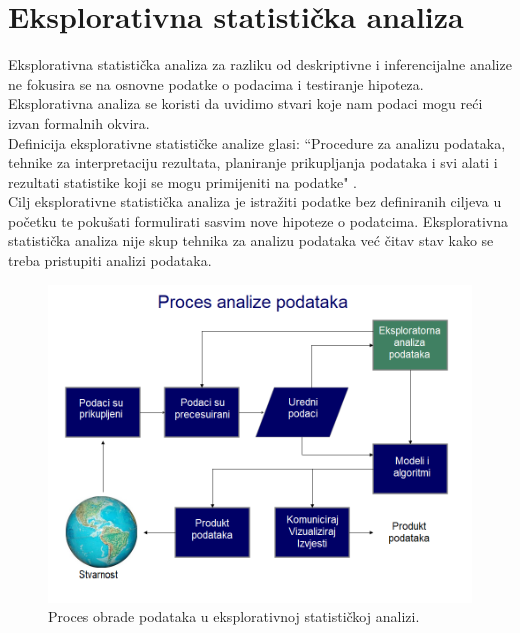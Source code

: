\documentclass[times,utf8,zavrsni]{fer}
\begin{document}



\newpage
\section{Eksplorativna statistička analiza}
Eksplorativna statistička analiza za razliku od deskriptivne i inferencijalne analize ne fokusira se na osnovne podatke o podacima i testiranje hipoteza. Eksplorativna analiza se koristi da uvidimo stvari koje nam podaci mogu reći izvan formalnih okvira. \\

Definicija eksplorativne statističke analize glasi: ``Procedure za analizu podataka, tehnike za interpretaciju rezultata, planiranje prikupljanja podataka i svi alati i rezultati statistike koji se mogu primijeniti na podatke" \citep{tukey}. \\

Cilj eksplorativne statistička analiza je istražiti podatke bez definiranih ciljeva u početku te pokušati formulirati sasvim nove hipoteze o podatcima. Eksplorativna statistička analiza nije skup tehnika za analizu podataka već čitav stav kako se treba pristupiti analizi podataka. \\

\begin{figure}[]
	\centering
	\includegraphics[width=\columnwidth]{img/eda.png}
	\caption{Proces obrade podataka u eksplorativnoj statističkoj analizi.\protect\footnotemark}
	\label{fig:eda}
\end{figure}

\end{document}
